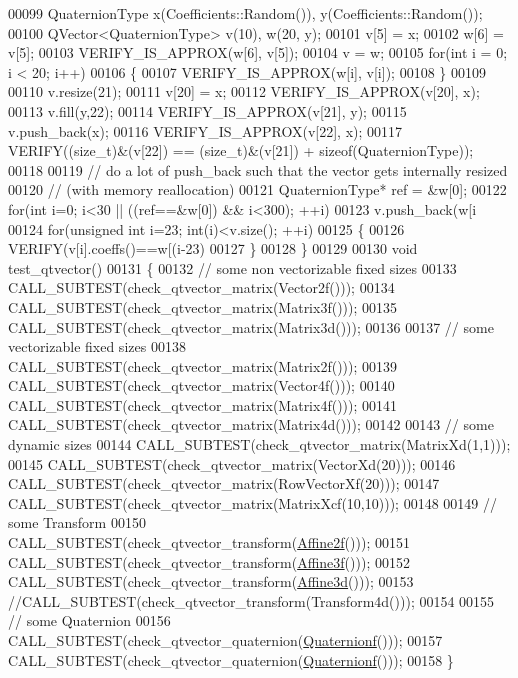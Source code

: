 \begin{DoxyCode}
00099   QuaternionType x(Coefficients::Random()), y(Coefficients::Random());
00100   QVector<QuaternionType> v(10), w(20, y);
00101   v[5] = x;
00102   w[6] = v[5];
00103   VERIFY\_IS\_APPROX(w[6], v[5]);
00104   v = w;
00105   \textcolor{keywordflow}{for}(\textcolor{keywordtype}{int} i = 0; i < 20; i++)
00106   \{
00107     VERIFY\_IS\_APPROX(w[i], v[i]);
00108   \}
00109 
00110   v.resize(21);
00111   v[20] = x;
00112   VERIFY\_IS\_APPROX(v[20], x);
00113   v.fill(y,22);
00114   VERIFY\_IS\_APPROX(v[21], y);
00115   v.push\_back(x);
00116   VERIFY\_IS\_APPROX(v[22], x);
00117   VERIFY((\textcolor{keywordtype}{size\_t})&(v[22]) == (\textcolor{keywordtype}{size\_t})&(v[21]) + \textcolor{keyword}{sizeof}(QuaternionType));
00118 
00119   \textcolor{comment}{// do a lot of push\_back such that the vector gets internally resized}
00120   \textcolor{comment}{// (with memory reallocation)}
00121   QuaternionType* ref = &w[0];
00122   \textcolor{keywordflow}{for}(\textcolor{keywordtype}{int} i=0; i<30 || ((ref==&w[0]) && i<300); ++i)
00123     v.push\_back(w[i%
00124   \textcolor{keywordflow}{for}(\textcolor{keywordtype}{unsigned} \textcolor{keywordtype}{int} i=23; int(i)<v.size(); ++i)
00125   \{
00126     VERIFY(v[i].coeffs()==w[(i-23)%
00127   \}
00128 \}
00129 
00130 \textcolor{keywordtype}{void} test\_qtvector()
00131 \{
00132   \textcolor{comment}{// some non vectorizable fixed sizes}
00133   CALL\_SUBTEST(check\_qtvector\_matrix(Vector2f()));
00134   CALL\_SUBTEST(check\_qtvector\_matrix(Matrix3f()));
00135   CALL\_SUBTEST(check\_qtvector\_matrix(Matrix3d()));
00136 
00137   \textcolor{comment}{// some vectorizable fixed sizes}
00138   CALL\_SUBTEST(check\_qtvector\_matrix(Matrix2f()));
00139   CALL\_SUBTEST(check\_qtvector\_matrix(Vector4f()));
00140   CALL\_SUBTEST(check\_qtvector\_matrix(Matrix4f()));
00141   CALL\_SUBTEST(check\_qtvector\_matrix(Matrix4d()));
00142 
00143   \textcolor{comment}{// some dynamic sizes}
00144   CALL\_SUBTEST(check\_qtvector\_matrix(MatrixXd(1,1)));
00145   CALL\_SUBTEST(check\_qtvector\_matrix(VectorXd(20)));
00146   CALL\_SUBTEST(check\_qtvector\_matrix(RowVectorXf(20)));
00147   CALL\_SUBTEST(check\_qtvector\_matrix(MatrixXcf(10,10)));
00148 
00149   \textcolor{comment}{// some Transform}
00150   CALL\_SUBTEST(check\_qtvector\_transform(\hyperlink{group___geometry___module_ga2c1ea05a21899654ee3a2e3f91fa30e0}{Affine2f}()));
00151   CALL\_SUBTEST(check\_qtvector\_transform(\hyperlink{group___geometry___module_ga17e901de8ff882aea7845c5457db6a4f}{Affine3f}()));
00152   CALL\_SUBTEST(check\_qtvector\_transform(\hyperlink{group___geometry___module_gaaffa69d3143826efeb84e5d6c56a4c78}{Affine3d}()));
00153   \textcolor{comment}{//CALL\_SUBTEST(check\_qtvector\_transform(Transform4d()));}
00154 
00155   \textcolor{comment}{// some Quaternion}
00156   CALL\_SUBTEST(check\_qtvector\_quaternion(\hyperlink{group___geometry___module_ga785b13a5a87f9bf55d4eba51ead2dcf0}{Quaternionf}()));
00157   CALL\_SUBTEST(check\_qtvector\_quaternion(\hyperlink{group___geometry___module_ga785b13a5a87f9bf55d4eba51ead2dcf0}{Quaternionf}()));
00158 \}
\end{DoxyCode}
